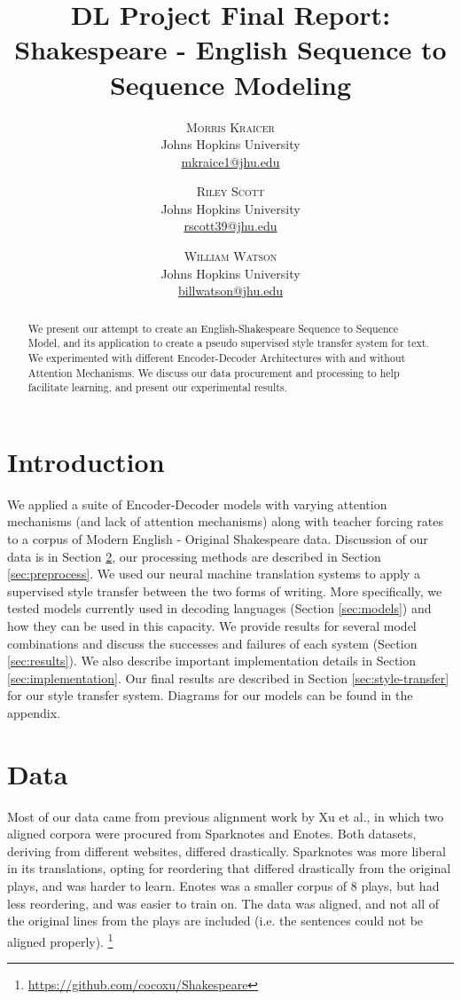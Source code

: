 \documentclass[twoside,twocolumn]{article}
\title{DL Project Final Report:\\
       Shakespeare - English Sequence to Sequence Modeling}
\author{%
\textsc{Morris Kraicer} \\[1ex]
\normalsize Johns Hopkins University \\
\normalsize \href{mailto:mkraice1@jhu.edu}{mkraice1@jhu.edu}
 \and
 \textsc{Riley Scott} \\[1ex]
\normalsize Johns Hopkins University \\
\normalsize \href{mailto:rscott39@jhu.edu}{rscott39@jhu.edu}
 \and
  \textsc{William Watson} \\[1ex]
\normalsize Johns Hopkins University \\
\normalsize \href{mailto:billwatson@jhu.edu}{billwatson@jhu.edu}
}
\date{}%
\begin{document}
\maketitle



\begin{abstract}
\noindent
We present our attempt to create an English-Shakespeare Sequence to Sequence
Model, and its application to create a pseudo supervised style transfer system
for text. We experimented with different Encoder-Decoder Architectures with and
without Attention Mechanisms. We discuss our data procurement and processing
to help facilitate learning, and present our experimental results.
\end{abstract}

\section{Introduction}
We applied a suite of Encoder-Decoder models with varying attention
mechanisms (and lack of attention mechanisms) along with teacher forcing rates
to a corpus of Modern English - Original Shakespeare data. Discussion of our
data is in Section \ref{sec:data},
our processing methods are described in Section \ref{sec:preprocess}.
We used our neural machine translation systems to
apply a supervised style transfer between the two forms of writing.
More specifically, we tested models currently
used in decoding languages (Section \ref{sec:models}) and how they can
be used in this capacity. We provide results for several model
combinations and discuss the successes and failures of each system
(Section \ref{sec:results}). We also describe important implementation details
in Section \ref{sec:implementation}. Our final results are described in
Section \ref{sec:style-transfer} for our style transfer system.
Diagrams for our models can be found in the appendix.
\section{Data}
\label{sec:data}
Most of our data came from previous alignment work
by Xu et al.\cite{xu2012paraphrasing}, in which
two aligned corpora were procured from Sparknotes and Enotes. Both datasets,
deriving from different websites, differed drastically. Sparknotes was more
liberal in its translations, opting for reordering that differed drastically
from the original plays, and was harder to learn. Enotes was a smaller corpus
of 8 plays, but had less reordering, and was easier to train on.
The data was aligned, and not all of the original lines
from the plays are included (i.e. the sentences could not be aligned properly).
\footnote{\url{https://github.com/cocoxu/Shakespeare}}
\end{document}

